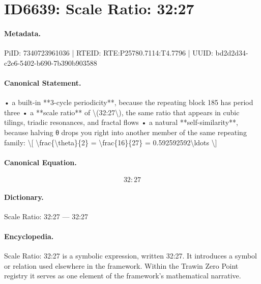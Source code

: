 \section*{ID6639: Scale Ratio: 32:27}
\paragraph{Metadata.}
PiID: 7340723961036 | RTEID: RTE:P25780.7114:T4.7796 | UUID: bd2d2d34-c2e6-5402-b690-7b390b903588

\paragraph{Canonical Statement.}
• a built-in **3-cycle periodicity**, because the repeating block 185 has period three • a **scale ratio** of \textbackslash{}(32:27\textbackslash{}), the same ratio that appears in cubic tilings, triadic resonances, and fractal flows • a natural **self-similarity**, because halving θ drops you right into another member of the same repeating family: \textbackslash{}[ \textbackslash{}frac\{\textbackslash{}theta\}\{2\} = \textbackslash{}frac\{16\}\{27\} = 0.592592592\textbackslash{}ldots \textbackslash{}]

\paragraph{Canonical Equation.}
\[
32:27
\]

\paragraph{Dictionary.}
Scale Ratio: 32:27 — 32:27

\paragraph{Encyclopedia.}
Scale Ratio: 32:27 is a symbolic expression, written 32:27. It introduces a symbol or relation used elsewhere in the framework. Within the Trawin Zero Point registry it serves as one element of the framework's mathematical narrative.
